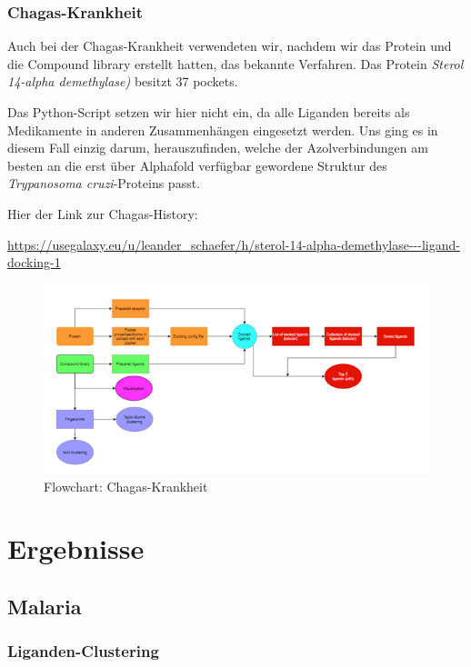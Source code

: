 \documentclass[10pt]{article}
\begin{document}
    \subsubsection{Chagas-Krankheit}
    Auch bei der Chagas-Krankheit verwendeten wir, nachdem wir das Protein und die Compound library erstellt hatten,
    das bekannte Verfahren.
    Das Protein \emph{Sterol 14-alpha demethylase)} besitzt 37 pockets.

    Das Python-Script setzen wir hier nicht ein, da alle Liganden bereits als Medikamente in anderen
    Zusammenhängen eingesetzt werden.
    Uns ging es in diesem Fall einzig darum, herauszufinden, welche der
    Azolverbindungen am besten an die erst über Alphafold verfügbar gewordene Struktur des \emph{Trypanosoma
    cruzi}-Proteins passt.

    Hier der Link zur Chagas-History:

    \url{https://usegalaxy.eu/u/leander_schaefer/h/sterol-14-alpha-demethylase---ligand-docking-1}


    \begin{figure}[h]
        \centering
        \includegraphics[width=0.7\linewidth]{chagas-flowchart}
        \caption{Flowchart: Chagas-Krankheit}
    \end{figure}


    \section{Ergebnisse}\label{sec:ergebnisse}

    \subsection{Malaria}\label{subsec:malaria}

    \subsubsection{Liganden-Clustering}
\end{document}
